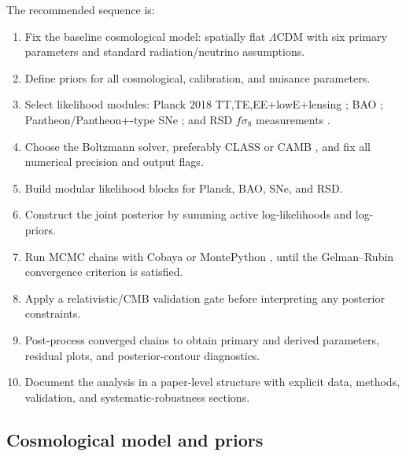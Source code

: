 \documentclass[pdflatex,sn-mathphys-num]{sn-jnl}%
\begin{document}
The recommended sequence is:
\begin{enumerate}
    \item Fix the baseline cosmological model: spatially flat $\Lambda$CDM with six primary parameters and standard radiation/neutrino assumptions.
    \item Define priors for all cosmological, calibration, and nuisance parameters.
    \item Select likelihood modules: Planck 2018 TT,TE,EE+lowE+lensing \cite{Aghanim:2018eyx,Planck:2019nip}; BAO \cite{Beutler:2011hx,Ross:2014qpa,Alam:2016hwk,Alam:2020sor}; Pantheon/Pantheon+-type SNe \cite{Brout2022}; and RSD $f\sigma_8$ measurements \cite{Alam:2016hwk,Alam:2020sor}.
    \item Choose the Boltzmann solver, preferably CLASS or CAMB \cite{Blas:2011rf,Lewis:1999bs}, and fix all numerical precision and output flags.
    \item Build modular likelihood blocks for Planck, BAO, SNe, and RSD.
    \item Construct the joint posterior by summing active log-likelihoods and log-priors.
    \item Run MCMC chains with Cobaya or MontePython \cite{Torrado:2020dgo}, until the Gelman--Rubin convergence criterion is satisfied.
    \item Apply a relativistic/CMB validation gate before interpreting any posterior constraints.
    \item Post-process converged chains to obtain primary and derived parameters, residual plots, and posterior-contour diagnostics.
    \item Document the analysis in a paper-level structure with explicit data, methods, validation, and systematic-robustness sections.
\end{enumerate}

\subsection{Cosmological model and priors}
\label{subsec:pipeline_model_priors}
\end{document}
